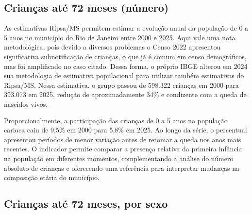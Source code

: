 
\subsection{Crianças até 72 meses (número)}


As estimativas Ripsa/MS permitem estimar a evolução anual da população de 0 a 5 anos no município do Rio de Janeiro entre 2000 e 2025. Aqui vale uma nota metodológica, pois devido a diversos problemas o Censo 2022 apresentou significativa subnotificação de crianças, o que já é comum em censo demográficos, mas foi amplificado no caso citado. Dessa forma, o próprio IBGE alterou em 2024 sua metodologia de estimativa populacional para utilizar também estimativas do Ripsa/MS. Nessa estimativa, o grupo passou de 598.322 crianças em 2000 para 393.073 em 2025, redução de aproximadamente 34\% e condizente com a queda de nascidos vivos.


Proporcionalmente, a participação das crianças de 0 a 5 anos na população carioca caiu de 9,5\% em 2000 para 5,8\% em 2025. Ao longo da série, o percentual apresentou períodos de menor variação antes de retomar a queda nos anos mais recentes. O indicador permite comparar a presença relativa da primeira infância na população em diferentes momentos, complementando a análise do número absoluto de crianças e oferecendo uma referência para interpretar mudanças na composição etária do município.


\subsection{Crianças até 72 meses, por sexo}


